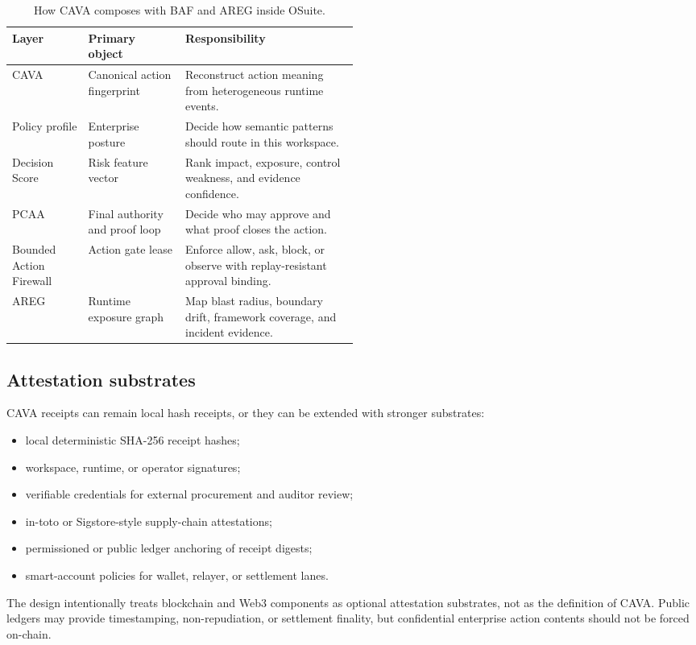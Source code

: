 \documentclass[11pt]{article}
\begin{document}
\begin{table}[t]
\centering
\small
\caption{How CAVA composes with BAF and AREG inside OSuite.}
\label{tab:cava-baf-areg}
\begin{tabularx}{\linewidth}{@{}L{0.22\linewidth}L{0.28\linewidth}X@{}}
\toprule
Layer & Primary object & Responsibility \\
\midrule
CAVA & Canonical action fingerprint & Reconstruct action meaning from heterogeneous runtime events. \\
Policy profile & Enterprise posture & Decide how semantic patterns should route in this workspace. \\
Decision Score & Risk feature vector & Rank impact, exposure, control weakness, and evidence confidence. \\
PCAA & Final authority and proof loop & Decide who may approve and what proof closes the action. \\
Bounded Action Firewall & Action gate lease & Enforce allow, ask, block, or observe with replay-resistant approval binding. \\
AREG & Runtime exposure graph & Map blast radius, boundary drift, framework coverage, and incident evidence. \\
\bottomrule
\end{tabularx}
\end{table}

\subsection{Attestation substrates}

CAVA receipts can remain local hash receipts, or they can be extended with stronger substrates:
\begin{itemize}
  \item local deterministic SHA-256 receipt hashes;
  \item workspace, runtime, or operator signatures;
  \item verifiable credentials for external procurement and auditor review;
  \item in-toto or Sigstore-style supply-chain attestations;
  \item permissioned or public ledger anchoring of receipt digests;
  \item smart-account policies for wallet, relayer, or settlement lanes.
\end{itemize}

The design intentionally treats blockchain and Web3 components as optional attestation substrates, not as the definition of CAVA. Public ledgers may provide timestamping, non-repudiation, or settlement finality, but confidential enterprise action contents should not be forced on-chain.
\end{document}
